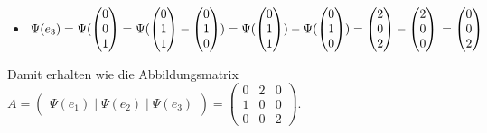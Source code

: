 \begin{itemize}
\item $\Psi(e_3)=\Psi(\begin{pmatrix} 0 \\ 0\\1\end{pmatrix}=\Psi(\begin{pmatrix}0\\1\\1 \end{pmatrix}-\begin{pmatrix} 0\\1\\0\end{pmatrix})=\Psi(\begin{pmatrix}0\\1\\1 \end{pmatrix})-\Psi(\begin{pmatrix} 0\\1\\0\end{pmatrix})= \begin{pmatrix} 2 \\ 0 \\ 2\end{pmatrix}- \begin{pmatrix}2\\0\\0\end{pmatrix}\\= \begin{pmatrix}0\\0\\2\end{pmatrix}$
\end{itemize}

Damit erhalten wie die Abbildungsmatrix $A=\begin{pmatrix} \Psi(e_1)\mid \Psi(e_2) \mid \Psi(e_3)\end{pmatrix}=\begin{pmatrix}0&2&0\\1&0&0\\0&0&2 \end{pmatrix}$.



